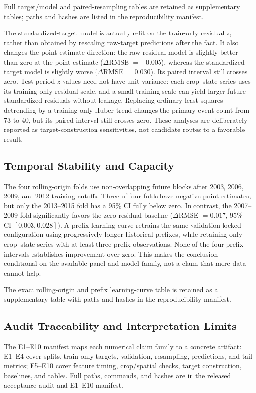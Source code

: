 \documentclass[conference]{IEEEtran}
\begin{document}
Full target/model and paired-resampling tables are retained as supplementary
tables; paths and hashes are listed in the reproducibility manifest.

The standardized-target model is actually refit on the train-only residual $z$,
rather than obtained by rescaling raw-target predictions after the fact. It also
changes the point-estimate direction: the raw-residual model is slightly better
than zero at the point estimate ($\Delta$RMSE $=-0.005$), whereas the
standardized-target model is slightly worse ($\Delta$RMSE $=0.030$). Its paired
interval still crosses zero. Test-period $z$ values need not have unit variance:
each crop--state series uses its training-only residual scale, and a small training
scale can yield larger future standardized residuals without leakage. Replacing ordinary least-squares detrending by a
training-only Huber trend changes the primary event count from 73 to 40, but its
paired interval still crosses zero. These analyses are deliberately reported as
target-construction sensitivities, not candidate routes to a favorable result.

\subsection{Temporal Stability and Capacity}
The four rolling-origin folds use non-overlapping future blocks after 2003, 2006,
2009, and 2012 training cutoffs. Three of four folds have negative point
estimates, but only the 2013--2015 fold has a 95\% CI fully below zero. In
contrast, the 2007--2009 fold significantly favors the zero-residual baseline
($\Delta$RMSE $=0.017$, 95\% CI $[0.003,0.028]$). A prefix learning curve retrains the same validation-locked
configuration using progressively longer historical prefixes, while retaining only
crop--state series with at least three prefix observations. None of the four
prefix intervals establishes improvement over zero. This makes the conclusion
conditional on the available panel and model family, not a claim that more data
cannot help.

The exact rolling-origin and prefix learning-curve table is retained as a
supplementary table with paths and hashes in the reproducibility manifest.

\subsection{Audit Traceability and Interpretation Limits}
The E1--E10 manifest maps each numerical claim family to a concrete artifact:
E1--E4 cover splits, train-only targets, validation, resampling, predictions, and
tail metrics; E5--E10 cover feature timing, crop/spatial checks, target
construction, baselines, and tables. Full paths, commands, and hashes are in the
released acceptance audit and E1--E10 manifest.
\end{document}
